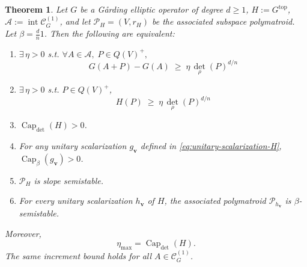 \documentclass[oneside,english,letterpaper]{amsart}
\numberwithin{equation}{section}
\theoremstyle{plain}
\newtheorem{thm}{Theorem}[section]
\theoremstyle{definition}
\theoremstyle{remark}
\newcommand{\gar}{\ifmmode\mathrm{G\mathring{a}rding}\else G{\aa}rding\fi}
\def\v{\mathbf{v}}
\def\Capacity{\operatorname{Cap}}
\begin{document}
\begin{thm}
\label{thm:det-ellipticity-capacity}
Let \(G\) be a \gar{} elliptic operator of degree $d\geq1$, \(H:=G^{\mathrm{top}}\), {$\mathcal A:=\operatorname{int}\mathcal C_G^{(1)}$}, and let \(\mathcal P_H=(V,r_H)\) be the associated subspace polymatroid. Let $\beta=\frac{d}{n}\mathrm{1}$. Then the following are equivalent:
\begin{enumerate}[label=\textnormal{(\arabic*)}]
\item\label{enu:det-ellipticity-1} \(\exists\,\eta>0\) s.t. \(\forall A\in\mathcal A,\;P\in Q(V)^+,\)
\[
G(A+P)-G(A)\;\ge\;\eta\,\det_\rho(P)^{d/n}
\]
\item\label{enu:det-ellipticity-2} \(\exists\,\eta>0\) s.t. \(P\in Q(V)^+\),
\[
H(P)\;\ge\;\eta\,\det_\rho(P)^{d/n}
\]
\item\label{enu:det-ellipticity-3} \(\Capacity_{\det}(H)>0\).
\item\label{enu:det-ellipticity-4} For any unitary scalarization  $g_\v$ defined in \eqref{eq:unitary-scalarization-H}, $\Capacity_\beta(g_\v)>0$.
\item\label{enu:det-ellipticity-5} \(\mathcal P_H\) is slope semistable.
\item\label{enu:det-ellipticity-6} For every unitary scalarization \(h_\v\) of \(H\), the associated
polymatroid \(\mathcal P_{h_\v}\) is \(\beta\)-semistable.
\end{enumerate}
Moreover,
\[
\eta_{\max}=\Capacity_{\det}(H).
\]
The same increment bound holds for all $A\in\mathcal C_G^{(1)}$.

\end{thm}
\end{document}

